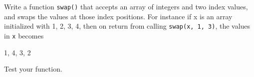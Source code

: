 Write a function \texttt{swap()} that accepts an array of integers and two index values, and swaps the values at those index positions. For instance if x is an array initialized with {1, 2, 3, 4}, then on return from calling \texttt{swap(x, 1, 3)}, the values in \texttt{x} becomes



1, 4, 3, 2



Test your function.

